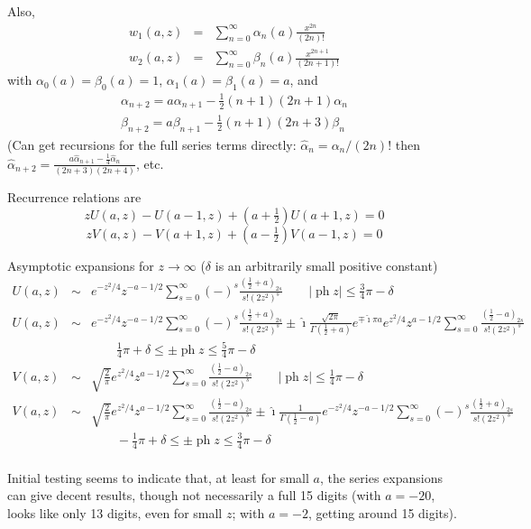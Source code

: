 \documentclass[10pt,dvipdfmx,letterpaper,twoside]{article}
\let\O=\operatorname
\newcommand{\ii}{{\hat{\imath}}}
\newenvironment{implementation}{\noindent\begin{framed}}{\end{framed}}
\let\al=\alpha
\let\Gam=\Gamma
\begin{document}
Also,
\begin{eqnarray*}
w_1(a,z) &=& \sum_{n=0}^\infty \al_n(a) \frac{x^{2n}}{(2n)!} \\
w_2(a,z) &=& \sum_{n=0}^\infty \beta_n(a) \frac{x^{2n+1}}{(2n+1)!}
\end{eqnarray*}
with $\al_0(a)=\beta_0(a)=1$, $\al_1(a)=\beta_1(a)=a$, and
\begin{eqnarray*}
\al_{n+2} = a \al_{n+1} - \frac12(n+1)(2n+1)\al_n \\
\beta_{n+2} = a \beta_{n+1} - \frac12(n+1)(2n+3)\beta_n
\end{eqnarray*}
(Can get recursions for the full series terms directly: $\hat\al_n = \al_n/(2n)!$ then
$\hat\al_{n+2} = \frac{a \hat\al_{n+1} - \frac14\hat\al_n}{(2n+3)(2n+4)}$, etc.

Recurrence relations are
\[ z U(a,z) - U(a-1,z) + (a+\tfrac12)U(a+1,z) = 0 \]
\[ z V(a,z) - V(a+1,z) + (a-\tfrac12)V(a-1,z) = 0 \]

Asymptotic expansions for $z\to\infty$ ($\delta$ is an arbitrarily small positive constant)
\begin{eqnarray*}
U(a,z) &\sim& e^{-z^2/4} z^{-a-1/2} \sum_{s=0}^\infty(-)^s\frac{(\tfrac12+a)_{2s}}{s!(2z^2)^s} \qquad |\O{ph}z|\leq\tfrac34\pi-\delta \\
U(a,z) &\sim& e^{-z^2/4}z^{-a-1/2}\sum_{s=0}^\infty(-)^s\frac{(\tfrac12+a)_{2s}}{s!(2z^2)^s} 
  \pm\ii\frac{\sqrt{2\pi}}{\Gam(\tfrac12+a)}e^{\mp\ii\pi a}e^{z^2/4}z^{a-1/2}\sum_{s=0}^\infty\frac{(\tfrac12-a)_{2s}}{s!(2z^2)^s} \\
  &&\qquad \tfrac14\pi+\delta\leq\pm\O{ph}z\leq\tfrac54\pi-\delta \\
V(a,z) &\sim& \sqrt{\frac2\pi}e^{z^2/4}z^{a-1/2} \sum_{s=0}^\infty\frac{(\tfrac12-a)_{2s}}{s!(2z^2)^s} \qquad |\O{ph}z|\leq\tfrac14\pi-\delta \\
V(a,z) &\sim& \sqrt{\frac2\pi}e^{z^2/4}z^{a-1/2}\sum_{s=0}^\infty\frac{(\tfrac12-a)_{2s}}{s!(2z^2)^s} 
  \pm\ii\frac{1}{\Gam(\tfrac12-a)}e^{-z^2/4}z^{-a-1/2}\sum_{s=0}^\infty(-)^s\frac{(\tfrac12+a)_{2s}}{s!(2z^2)^s} \\
  &&\qquad -\tfrac14\pi+\delta\leq\pm\O{ph}z\leq\tfrac34\pi-\delta \\
\end{eqnarray*}

\begin{implementation}
Initial testing seems to indicate that, at least for small $a$, the series expansions can give decent results, though
not necessarily a full 15 digits (with $a=-20$, looks like only 13 digits, even for small $z$; with $a=-2$, getting around 15 digits).
\end{implementation}
\end{document}
